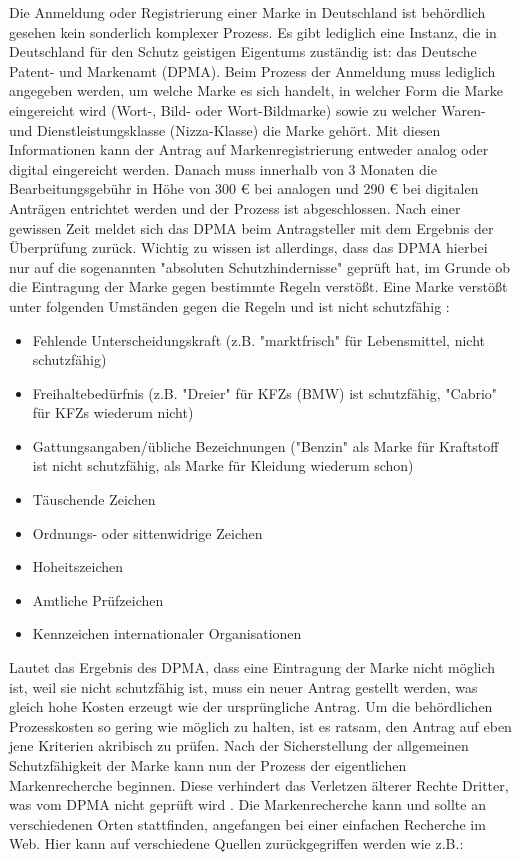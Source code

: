 Die Anmeldung oder Registrierung einer Marke in Deutschland ist behördlich gesehen kein sonderlich komplexer Prozess. Es gibt lediglich eine Instanz, die in Deutschland für den Schutz geistigen Eigentums zuständig ist: das Deutsche Patent- und Markenamt (DPMA). Beim Prozess der Anmeldung muss lediglich angegeben werden, um welche Marke es sich handelt, in welcher Form die Marke eingereicht wird (Wort-, Bild- oder Wort-Bildmarke) sowie zu welcher Waren- und Dienstleistungsklasse (Nizza-Klasse) die Marke gehört. Mit diesen Informationen kann der Antrag auf Markenregistrierung entweder analog oder digital eingereicht werden. Danach muss innerhalb von 3 Monaten die Bearbeitungsgebühr in Höhe von 300 € bei analogen und 290 € bei digitalen Anträgen entrichtet werden und der Prozess ist abgeschlossen. Nach einer gewissen Zeit meldet sich das DPMA beim Antragsteller mit dem Ergebnis der Überprüfung zurück. Wichtig zu wissen ist allerdings, dass das DPMA hierbei nur auf die sogenannten "absoluten Schutzhindernisse" geprüft hat, im Grunde ob die Eintragung der Marke gegen bestimmte Regeln verstößt. Eine Marke verstößt unter folgenden Umständen gegen die Regeln und ist nicht schutzfähig : 

\begin{itemize}
    \item Fehlende Unterscheidungskraft (z.B. "marktfrisch" für Lebensmittel, nicht schutzfähig)
    \item Freihaltebedürfnis (z.B. "Dreier" für KFZs (BMW) ist schutzfähig, "Cabrio" für KFZs wiederum nicht)
    \item Gattungsangaben/übliche Bezeichnungen ("Benzin" als Marke für Kraftstoff ist nicht schutzfähig, als Marke für Kleidung wiederum schon)
    \item Täuschende Zeichen
    \item Ordnungs- oder sittenwidrige Zeichen
    \item Hoheitszeichen
    \item Amtliche Prüfzeichen
    \item Kennzeichen internationaler Organisationen
\end{itemize}

Lautet das Ergebnis des DPMA, dass eine Eintragung der Marke nicht möglich ist, weil sie nicht schutzfähig ist, muss ein neuer Antrag gestellt werden, was gleich hohe Kosten erzeugt wie der ursprüngliche Antrag. Um die behördlichen Prozesskosten so gering wie möglich zu halten, ist es ratsam, den Antrag auf eben jene Kriterien akribisch zu prüfen. Nach der Sicherstellung der allgemeinen Schutzfähigkeit der Marke kann nun der Prozess der eigentlichen Markenrecherche beginnen. Diese verhindert das Verletzen älterer Rechte Dritter, was vom DPMA nicht geprüft wird . Die Markenrecherche kann und sollte an verschiedenen Orten stattfinden, angefangen bei einer einfachen Recherche im Web. Hier kann auf verschiedene Quellen zurückgegriffen werden wie z.B.:

